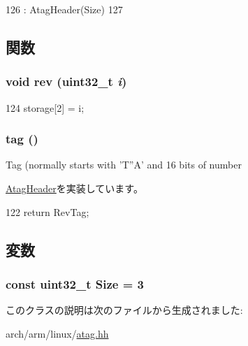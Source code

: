 \begin{DoxyCode}
126         : AtagHeader(Size)
127     {}
\end{DoxyCode}


\subsection{関数}
\hypertarget{classAtagRev_aabdf2f80aa3b23597642f98b1b83eeba}{
\subsubsection[{rev}]{\setlength{\rightskip}{0pt plus 5cm}void rev ({\bf uint32\_\-t} {\em i})}}
\label{classAtagRev_aabdf2f80aa3b23597642f98b1b83eeba}



\begin{DoxyCode}
124 { storage[2] = i; }
\end{DoxyCode}
\hypertarget{classAtagRev_afe29fbb80b1d2765e37e98c6d259ea52}{
\subsubsection[{tag}]{ tag ()}}
\label{classAtagRev_afe29fbb80b1d2765e37e98c6d259ea52}
Tag (normally starts with 'T''A' and 16 bits of number 

\hyperlink{classAtagHeader_adad80b4c3e973afddab9e70f05faecd9}{AtagHeader}を実装しています。


\begin{DoxyCode}
122 { return RevTag; }
\end{DoxyCode}


\subsection{変数}
\hypertarget{classAtagRev_a7ecea14dd0f3277e19580d4509fafdba}{
\subsubsection[{Size}]{\setlength{\rightskip}{0pt plus 5cm}const {\bf uint32\_\-t} {\bf Size} = 3}}
\label{classAtagRev_a7ecea14dd0f3277e19580d4509fafdba}


このクラスの説明は次のファイルから生成されました:\begin{DoxyCompactItemize}
\item 
arch/arm/linux/\hyperlink{atag_8hh}{atag.hh}\end{DoxyCompactItemize}

